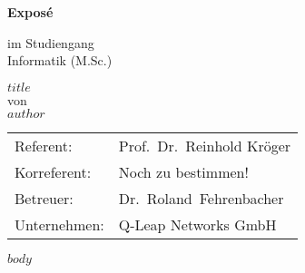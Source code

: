 \documentclass[ngerman,]{article}
\author{$author$}
\date{}
\begin{document}
\begin{titlepage}
    \begin{minipage}[t]{0.5\textwidth}
        \begin{large}
            \begin{flushleft}
              \hspace{1cm} 
            \end{flushleft}
        \end{large}
    \end{minipage}
    \begin{minipage}[t]{0.5\textwidth}
        \begin{large}
            \begin{flushright}
              \hspace{1cm}
            \end{flushright}
        \end{large}
    \end{minipage}
    \vspace{0.07\textheight}
    \begin{center}
        \begin{huge}
            \textbf{Exposé}\\
        \end{huge}
        \vspace{0.04\textheight}
        \begin{large}
            im Studiengang \\
            Informatik (M.Sc.)\\
        \end{large}
    \end{center}
    \vspace{0.10\textheight}
    \begin{center}
        \begin{large}
            $title$\\
            von\\
            $author$\\
        \end{large}
    \end{center}
    \begin{large}
        \begin{flushleft}
            \vfill
            \begin{tabularx}{\textwidth}{lX}
                Referent: & Prof.\ Dr.\ Reinhold Kröger\\
                Korreferent: & Noch zu bestimmen!\\
                Betreuer: & Dr.\ Roland\ Fehrenbacher\\
                Unternehmen: & Q-Leap Networks GmbH\\
            \end{tabularx}
        \end{flushleft}
    \end{large}
\end{titlepage}

$body$
\end{document}
